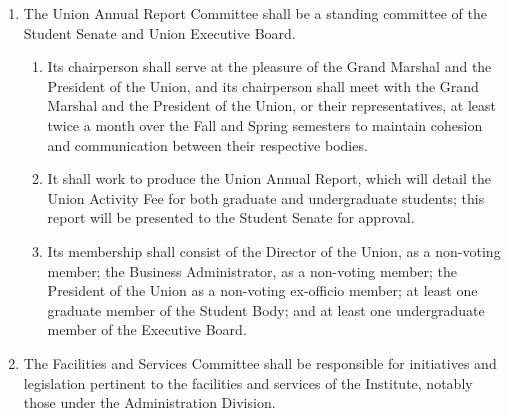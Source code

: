 \begin{enumerate}
\begin{enumerate}
\begin{enumerate}
    \end{enumerate}
  \item It shall attempt to maintain a diverse membership that represents various academic departments.
    \begin{enumerate}
    \item It shall attempt to include graduate and undergraduate representation on the committee.
    \end{enumerate}
  \item It shall inform the Senate and the student body of any changes in academics at the Institute.
  \item It shall be solely responsible for selecting all student representatives, including undergraduate and graduate representatives, to the Faculty Senate Curriculum Committee.
  \item It shall be responsible for maintaining regular contact between the Student Senate and the Faculty Senate.
  \end{enumerate}
\item The Union Annual Report Committee shall be a standing committee of the Student Senate and Union Executive Board.
  \begin{enumerate}
  \item Its chairperson shall serve at the pleasure of the Grand Marshal and the President of the Union, and its chairperson shall meet with the Grand Marshal and the President of the Union, or their representatives, at least twice a month over the Fall and Spring semesters to maintain cohesion and communication between their respective bodies.
  \item It shall work to produce the Union Annual Report, which will detail the Union Activity Fee for both graduate and undergraduate students; this report will be presented to the Student Senate for approval.
  \item Its membership shall consist of the Director of the Union, as a non-voting member; the Business Administrator, as a non-voting member; the President of the Union as a non-voting ex-officio member; at least one graduate member of the Student Body; and at least one undergraduate member of the Executive Board.
  \end{enumerate}
\item The Facilities and Services Committee shall be responsible for initiatives and legislation pertinent to the facilities and services of the Institute, notably those under the Administration Division.
  \begin{enumerate}

\end{enumerate}
\end{enumerate}
